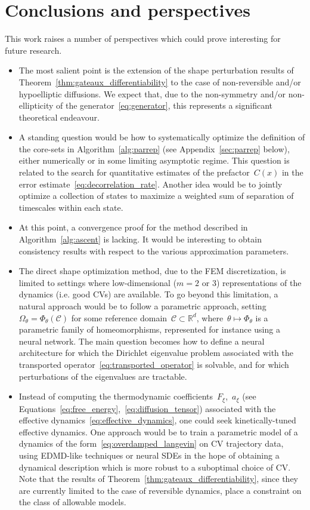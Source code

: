 \documentclass[a4]{article}
\newcommand{\R}{\mathbb{R}}
\newcommand{\1}{\mathbbm 1}
\begin{document}
\section{Conclusions and perspectives}
This work raises a number of perspectives which could prove interesting for future research.
\begin{itemize}
    \item The most salient point is the extension of the shape perturbation results of Theorem~\ref{thm:gateaux_differentiability} to the case of non-reversible and/or hypoelliptic diffusions. We expect that, due to the non-symmetry and/or non-ellipticity of the generator~\eqref{eq:generator}, this represents a significant theoretical endeavour.
    \item A standing question would be how to systematically optimize the definition of the core-sets in Algorithm~\ref{alg:parrep} (see Appendix~\ref{sec:parrep} below), either numerically or in some limiting asymptotic regime. This question is related to the search for quantitative estimates of the prefactor~$C(x)$ in the error estimate~\eqref{eq:decorrelation_rate}. Another idea would be to jointly optimize a collection of states to maximize a weighted sum of separation of timescales within each state.
    \item At this point, a convergence proof for the method described in Algorithm~\ref{alg:ascent} is lacking. It would be interesting to obtain consistency results with respect to the various approximation parameters.
    \item The direct shape optimization method, due to the FEM discretization, is limited to settings where low-dimensional ($m=2$ or $3$) representations of the dynamics (i.e. good CVs) are available. To go beyond this limitation, a natural approach would be to follow a parametric approach, setting~$\Omega_\theta=\Phi_\theta(\mathcal C)$ for some reference domain~$\mathcal C\subset \R^d$, where~$\theta\mapsto \Phi_\theta$ is a parametric family of homeomorphisms, represented for instance using a neural network. The main question becomes how to define a neural architecture for which the Dirichlet eigenvalue problem associated with the transported operator~\eqref{eq:transported_operator} is solvable, and for which perturbations of the eigenvalues are tractable.
    \item Instead of computing the thermodynamic coefficients~$F_\xi$,~$a_\xi$ (see Equations~\eqref{eq:free_energy},~\eqref{eq:diffusion_tensor}) associated with the effective dynamics~\eqref{eq:effective_dynamics}, one could seek kinetically-tuned effective dynamics. One approach would be to train a parametric model of a dynamics of the form~\eqref{eq:overdamped_langevin} on CV trajectory data, using EDMD-like techniques or neural SDEs in the hope of obtaining a dynamical description which is more robust to a suboptimal choice of CV. Note that the results of Theorem~\ref{thm:gateaux_differentiability}, since they are currently limited to the case of reversible dynamics, place a constraint on the class of allowable models.

\end{itemize}
\end{document}
